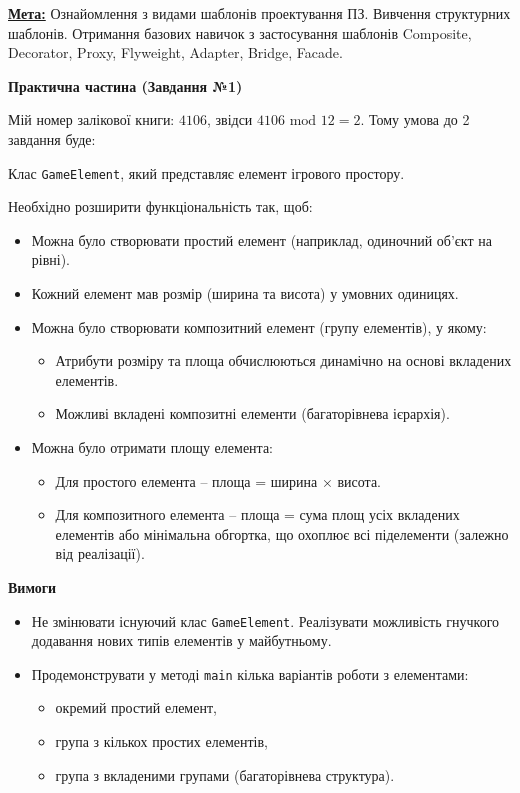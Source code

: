 \documentclass[12pt,a4paper]{article}
\begin{document}
    \vspace{1em}

    \textbf{\underline{Мета:}} Ознайомлення з видами шаблонів проектування ПЗ. Вивчення структурних
    шаблонів. Отримання базових навичок з застосування шаблонів Composite, Decorator, Proxy,
    Flyweight, Adapter, Bridge, Facade.

    \begin{center} \textbf{\Large Практична частина (Завдання №1)} \end{center}

    \setlength{\parindent}{1.5em}

    Мій номер залікової книги: $4106$, звідси $4106 \text{ mod } 12 = 2$. Тому умова до 2 завдання буде:

    Клас \texttt{GameElement}, який представляє елемент ігрового простору.

    Необхідно розширити функціональність так, щоб:
    \begin{itemize}
        \item Можна було створювати простий елемент (наприклад, одиночний об'єкт на рівні).
        \item Кожний елемент мав розмір (ширина та висота) у умовних одиницях.
        \item Можна було створювати композитний елемент (групу елементів), у якому:
        \begin{itemize}
            \item Атрибути розміру та площа обчислюються динамічно на основі вкладених елементів.
            \item Можливі вкладені композитні елементи (багаторівнева ієрархія).
        \end{itemize}
        \item Можна було отримати площу елемента:
        \begin{itemize}
            \item Для простого елемента – площа = ширина × висота.
            \item Для композитного елемента – площа = сума площ усіх вкладених елементів або мінімальна обгортка, що охоплює всі піделементи (залежно від реалізації).
        \end{itemize}
    \end{itemize}

    \textbf{Вимоги}
    \begin{itemize}
        \item Не змінювати існуючий клас \texttt{GameElement}. Реалізувати можливість гнучкого додавання нових типів елементів у майбутньому.
        \item Продемонструвати у методі \texttt{main} кілька варіантів роботи з елементами:
        \begin{itemize}
            \item окремий простий елемент,
            \item група з кількох простих елементів,
            \item група з вкладеними групами (багаторівнева структура).
        \end{itemize}
    \end{itemize}
\end{document}
